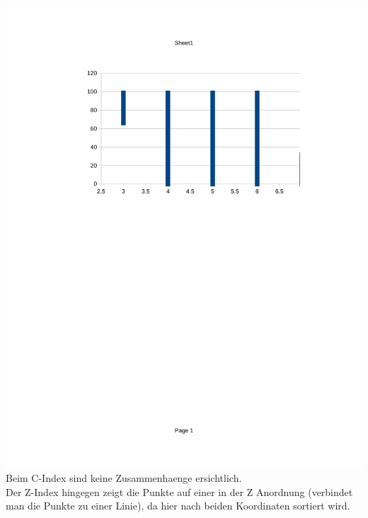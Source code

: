 \documentclass{uni_tue_template}
\begin{document}
\includegraphics[]{./cindex.pdf}\\
Beim C-Index sind keine Zusammenhaenge ersichtlich.\\

Der Z-Index hingegen zeigt die Punkte auf einer in der Z Anordnung (verbindet man die Punkte zu einer Linie), da hier nach beiden Koordinaten sortiert wird.
\end{document}
